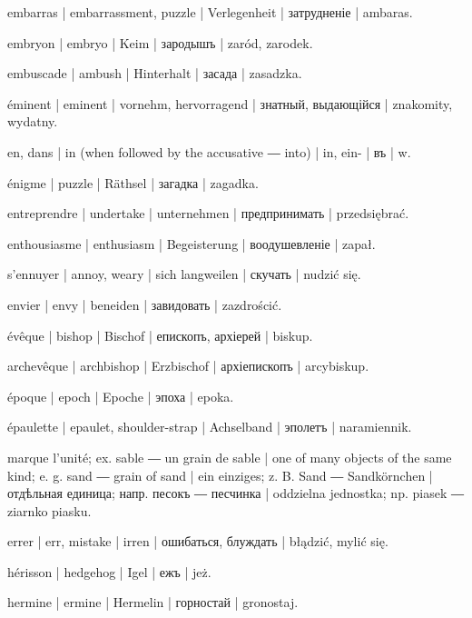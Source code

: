 \begin{outdent}{1em}
embarras | embarrassment, puzzle | Verlegenheit | затрудненіе | ambaras.

embryon | embryo | Keim | зародышъ | zaród, zarodek.

embuscade | ambush | Hinterhalt | засада | zasadzka.

éminent | eminent | vornehm, hervorragend | знатный,
выдающійся | znakomity, wydatny.

en, dans | in (when followed by the accusative ― into) | in,
ein- | въ | w.

énigme | puzzle | Räthsel | загадка | zagadka.

entreprendre | undertake | unternehmen | предпринимать | przedsiębrać.

enthousiasme | enthusiasm | Begeisterung | воодушевленіе | zapał.

s’ennuyer | annoy, weary | sich langweilen | скучать | nudzić
się.

envier | envy | beneiden | завидовать | zazdrościć.

évêque | bishop | Bischof | епископъ, архіерей | biskup.

\uvsubentry{}
archevêque | archbishop | Erzbischof | архіепископъ | arcybiskup.

époque | epoch | Epoche | эпоха | epoka.

épaulette | epaulet, shoulder-strap | Achselband | эполетъ | naramiennik.

marque l’unité; ex.  sable ―  un grain de
sable | one of many objects of the same kind; e. g.  sand ―
 grain of sand | ein einziges; z. B.  Sand ―
 Sandkörnchen | отдѣльная единица; напр.  песокъ ―
 песчинка | oddzielna jednostka; np.  piasek ―
 ziarnko piasku.

errer | err, mistake | irren | ошибаться, блуждать | błądzić,
mylić się.

hérisson | hedgehog | Igel | ежъ | jeż.

hermine | ermine | Hermelin | горностай | gronostaj.


\end{outdent}
